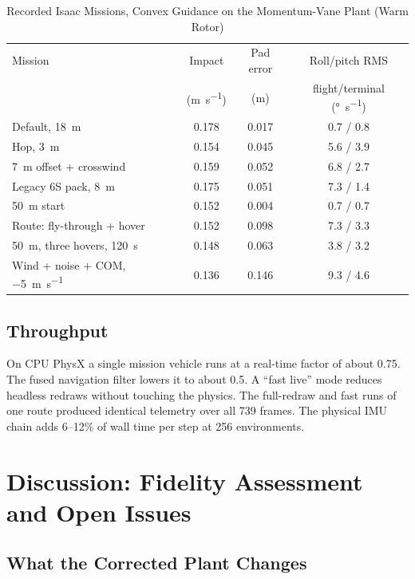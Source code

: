 \documentclass[journal]{IEEEtran}
\begin{document}
\begin{table}[t]
\caption{Recorded Isaac Missions, Convex Guidance on the Momentum-Vane Plant (Warm Rotor)}
\label{tab:missions}
\centering
\footnotesize
\setlength{\tabcolsep}{3pt}
\begin{tabular}{lccc}
\toprule
Mission & Impact & Pad error & Roll/pitch RMS \\
& (\si{\metre\per\second}) & (\si{\metre}) & flight/terminal (\si{\degree\per\second}) \\
\midrule
Default, \SI{18}{\metre} & 0.178 & 0.017 & 0.7 / 0.8 \\
Hop, \SI{3}{\metre} & 0.154 & 0.045 & 5.6 / 3.9 \\
\SI{7}{\metre} offset + crosswind & 0.159 & 0.052 & 6.8 / 2.7 \\
Legacy 6S pack, \SI{8}{\metre} & 0.175 & 0.051 & 7.3 / 1.4 \\
\SI{50}{\metre} start & 0.152 & 0.004 & 0.7 / 0.7 \\
Route: fly-through + hover & 0.152 & 0.098 & 7.3 / 3.3 \\
\SI{50}{\metre}, three hovers, \SI{120}{\second} & 0.148 & 0.063 & 3.8 / 3.2 \\
Wind + noise + COM, \SI{-5}{\metre\per\second} & 0.136 & 0.146 & 9.3 / 4.6 \\
\bottomrule
\end{tabular}
\end{table}

\subsection{Throughput}

On CPU PhysX a single mission vehicle runs at a real-time factor of about 0.75.
The fused navigation filter lowers it to about 0.5.
A ``fast live'' mode reduces headless redraws without touching the physics.
The full-redraw and fast runs of one route produced identical telemetry over all 739 frames.
The physical IMU chain adds 6--12\% of wall time per step at 256 environments.

\section{Discussion: Fidelity Assessment and Open Issues}
\label{sec:discussion}

\subsection{What the Corrected Plant Changes}
\end{document}
